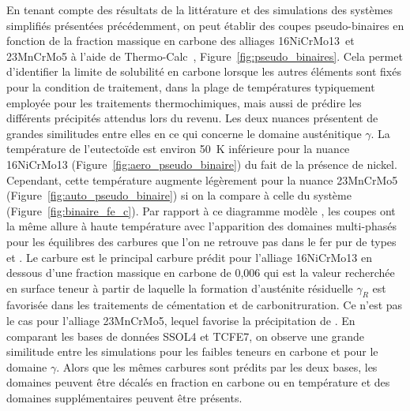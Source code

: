 En tenant compte des résultats de la littérature et des simulations des systèmes simplifiés présentées précédemment, on peut établir des coupes pseudo-binaires en fonction de la fraction massique en carbone des alliages 16NiCrMo13 et 23MnCrMo5 à l'aide de Thermo-Calc~\cite{Andersson2002,Borgenstam2000}, Figure~\ref{fig:pseudo_binaires}. Cela permet d'identifier la limite de solubilité en carbone lorsque les autres éléments sont fixés pour la condition de traitement, dans la plage de températures typiquement employée pour les traitements thermochimiques, mais aussi de prédire les différents précipités attendus lors du revenu. Les deux nuances présentent de grandes similitudes entre elles en ce qui concerne le domaine austénitique $\gamma$. La température de l'eutectoïde est environ \SI{50}{\kelvin} inférieure pour la nuance 16NiCrMo13 (Figure~\ref{fig:aero_pseudo_binaire}) du fait de la présence de nickel. Cependant, cette température augmente légèrement pour la nuance 23MnCrMo5 (Figure~\ref{fig:auto_pseudo_binaire}) si on la compare à celle du système  (Figure~\ref{fig:binaire_fe_c}). Par rapport à ce diagramme modèle , les coupes ont la même allure à haute température avec l'apparition des domaines multi-phasés pour les équilibres des carbures que l'on ne retrouve pas dans le fer pur de types  et . Le carbure  est le principal carbure prédit pour l'alliage 16NiCrMo13 en dessous d'une fraction massique en carbone de 0,006 qui est la valeur recherchée en surface \textendash{} teneur à partir de laquelle la formation d'austénite résiduelle $\gamma_{R}$ est favorisée \textendash{} dans les traitements de cémentation et de carbonitruration. Ce n'est pas le cas pour l'alliage 23MnCrMo5, lequel favorise la précipitation de . En comparant les bases de données SSOL4 et TCFE7, on observe une grande similitude entre les simulations pour les faibles teneurs en carbone et pour le domaine $\gamma$. Alors que les mêmes carbures sont prédits par les deux bases, les domaines peuvent être décalés en fraction en carbone ou en température et des domaines supplémentaires peuvent être présents.

